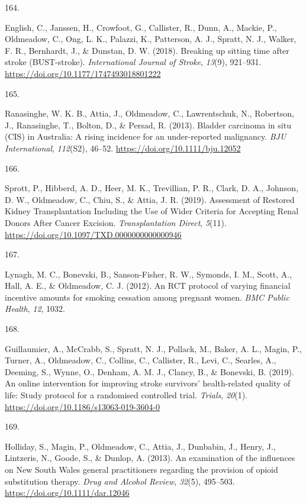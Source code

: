\documentclass[11pt, a4paper]{awesome-cv}
\newlength{\csllabelwidth}
\newcommand{\CSLLeftMargin}[1]{\parbox[t]{\csllabelwidth}{#1}}
\newcommand{\CSLRightInline}[1]{\parbox[t]{\linewidth - \csllabelwidth}{#1}}
\begin{document}
\leavevmode\hypertarget{ref-english_breaking_2018}{}%
\CSLLeftMargin{164. }
\CSLRightInline{English, C., Janssen, H., Crowfoot, G., Callister, R.,
Dunn, A., Mackie, P., Oldmeadow, C., Ong, L. K., Palazzi, K., Patterson,
A. J., Spratt, N. J., Walker, F. R., Bernhardt, J., \& Dunstan, D. W.
(2018). Breaking up sitting time after stroke (BUST-stroke).
\emph{International Journal of Stroke}, \emph{13}(9), 921--931.
\url{https://doi.org/10.1177/1747493018801222}}

\leavevmode\hypertarget{ref-ranasinghe_bladder_2013}{}%
\CSLLeftMargin{165. }
\CSLRightInline{Ranasinghe, W. K. B., Attia, J., Oldmeadow, C.,
Lawrentschuk, N., Robertson, J., Ranasinghe, T., Bolton, D., \& Persad,
R. (2013). Bladder carcinoma in situ (CIS) in Australia: A rising
incidence for an under-reported malignancy. \emph{BJU International},
\emph{112}(S2), 46--52. \url{https://doi.org/10.1111/bju.12052}}

\leavevmode\hypertarget{ref-sprott_assessment_2019}{}%
\CSLLeftMargin{166. }
\CSLRightInline{Sprott, P., Hibberd, A. D., Heer, M. K., Trevillian, P.
R., Clark, D. A., Johnson, D. W., Oldmeadow, C., Chiu, S., \& Attia, J.
R. (2019). Assessment of Restored Kidney Transplantation Including the
Use of Wider Criteria for Accepting Renal Donors After Cancer Excision.
\emph{Transplantation Direct}, \emph{5}(11).
\url{https://doi.org/10.1097/TXD.0000000000000946}}

\leavevmode\hypertarget{ref-lynagh_rct_2012}{}%
\CSLLeftMargin{167. }
\CSLRightInline{Lynagh, M. C., Bonevski, B., Sanson-Fisher, R. W.,
Symonds, I. M., Scott, A., Hall, A. E., \& Oldmeadow, C. J. (2012). An
RCT protocol of varying financial incentive amounts for smoking
cessation among pregnant women. \emph{BMC Public Health}, \emph{12},
1032.}

\leavevmode\hypertarget{ref-guillaumier_online_2019}{}%
\CSLLeftMargin{168. }
\CSLRightInline{Guillaumier, A., McCrabb, S., Spratt, N. J., Pollack,
M., Baker, A. L., Magin, P., Turner, A., Oldmeadow, C., Collins, C.,
Callister, R., Levi, C., Searles, A., Deeming, S., Wynne, O., Denham, A.
M. J., Clancy, B., \& Bonevski, B. (2019). An online intervention for
improving stroke survivors' health-related quality of life: Study
protocol for a randomised controlled trial. \emph{Trials}, \emph{20}(1).
\url{https://doi.org/10.1186/s13063-019-3604-0}}

\leavevmode\hypertarget{ref-holliday_examination_2013}{}%
\CSLLeftMargin{169. }
\CSLRightInline{Holliday, S., Magin, P., Oldmeadow, C., Attia, J.,
Dunbabin, J., Henry, J., Lintzeris, N., Goode, S., \& Dunlop, A. (2013).
An examination of the influences on New South Wales general
practitioners regarding the provision of opioid substitution therapy.
\emph{Drug and Alcohol Review}, \emph{32}(5), 495--503.
\url{https://doi.org/10.1111/dar.12046}}
\end{document}
